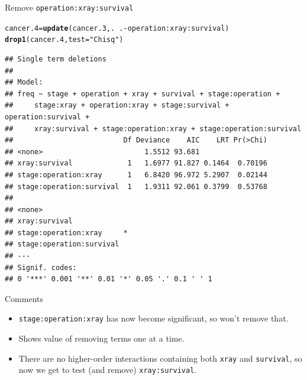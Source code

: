 \documentclass[unknownkeysallowed]{beamer}\usepackage[]{graphicx}\usepackage[]{color}
\makeatletter
\newcommand{\hlstr}[1]{\textcolor[rgb]{0.192,0.494,0.8}{#1}}%
\newcommand{\hlopt}[1]{\textcolor[rgb]{0,0,0}{#1}}%
\newcommand{\hlstd}[1]{\textcolor[rgb]{0.345,0.345,0.345}{#1}}%
\newcommand{\hlkwb}[1]{\textcolor[rgb]{0.69,0.353,0.396}{#1}}%
\newcommand{\hlkwc}[1]{\textcolor[rgb]{0.333,0.667,0.333}{#1}}%
\newcommand{\hlkwd}[1]{\textcolor[rgb]{0.737,0.353,0.396}{\textbf{#1}}}%
\newenvironment{kframe}{%
 \def\at@end@of@kframe{}%
 \ifinner\ifhmode%
  \def\at@end@of@kframe{\end{minipage}}%
  \begin{minipage}{\columnwidth}%
 \fi\fi%
 \def\FrameCommand##1{\hskip\@totalleftmargin \hskip-\fboxsep
 \colorbox{shadecolor}{##1}\hskip-\fboxsep
     \hskip-\linewidth \hskip-\@totalleftmargin \hskip\columnwidth}%
 \MakeFramed {\advance\hsize-\width
   \@totalleftmargin\z@ \linewidth\hsize
   \@setminipage}}%
 {\par\unskip\endMakeFramed%
 \at@end@of@kframe}
\newenvironment{knitrout}{}{} %
\makeatother
\begin{document}
\begin{frame}[fragile]{Remove \texttt{operation:xray:survival}}
  
\begin{knitrout}\scriptsize
{}\color{fgcolor}\begin{kframe}
\begin{alltt}
\hlstd{cancer.4}\hlkwb{=}\hlkwd{update}\hlstd{(cancer.3,.}\hlopt{~}\hlstd{.}\hlopt{-}\hlstd{operation}\hlopt{:}\hlstd{xray}\hlopt{:}\hlstd{survival)}
\hlkwd{drop1}\hlstd{(cancer.4,}\hlkwc{test}\hlstd{=}\hlstr{"Chisq"}\hlstd{)}
\end{alltt}
\begin{verbatim}
## Single term deletions
## 
## Model:
## freq ~ stage + operation + xray + survival + stage:operation + 
##     stage:xray + operation:xray + stage:survival + operation:survival + 
##     xray:survival + stage:operation:xray + stage:operation:survival
##                          Df Deviance    AIC    LRT Pr(>Chi)
## <none>                        1.5512 93.681                
## xray:survival             1   1.6977 91.827 0.1464  0.70196
## stage:operation:xray      1   6.8420 96.972 5.2907  0.02144
## stage:operation:survival  1   1.9311 92.061 0.3799  0.53768
##                           
## <none>                    
## xray:survival             
## stage:operation:xray     *
## stage:operation:survival  
## ---
## Signif. codes:  
## 0 '***' 0.001 '**' 0.01 '*' 0.05 '.' 0.1 ' ' 1
\end{verbatim}
\end{kframe}
\end{knitrout}
   
  
\end{frame}

\begin{frame}[fragile]{Comments}
  
  \begin{itemize}
  \item \texttt{stage:operation:xray} has now become significant, so
    won't remove that.
  \item Shows value of removing terms one at a time.
  \item There are no higher-order interactions containing both
    \texttt{xray} and \texttt{survival}, so now we get to test (and
    remove) \texttt{xray:survival}.
  \end{itemize}
  
\end{frame}
\end{document}
